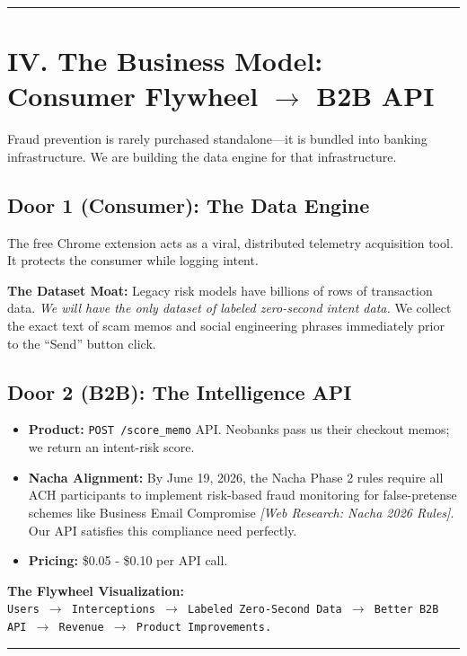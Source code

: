 \documentclass[11pt, letterpaper]{article}
\begin{document}
\vspace{12pt}
\hrule
\vspace{12pt}

\section*{IV. The Business Model: Consumer Flywheel $\rightarrow$ B2B API}

Fraud prevention is rarely purchased standalone—it is bundled into banking infrastructure. We are building the data engine for that infrastructure.

\subsection*{Door 1 (Consumer): The Data Engine}
The free Chrome extension acts as a viral, distributed telemetry acquisition tool. It protects the consumer while logging intent.

\textbf{The Dataset Moat:} Legacy risk models have billions of rows of transaction data. \textit{We will have the only dataset of labeled zero-second intent data.} We collect the exact text of scam memos and social engineering phrases immediately prior to the ``Send'' button click. 

\subsection*{Door 2 (B2B): The Intelligence API}
\begin{itemize}
    \item \textbf{Product:} \texttt{POST /score\_memo} API. Neobanks pass us their checkout memos; we return an intent-risk score.
    \item \textbf{Nacha Alignment:} By June 19, 2026, the Nacha Phase 2 rules require all ACH participants to implement risk-based fraud monitoring for false-pretense schemes like Business Email Compromise \textit{[Web Research: Nacha 2026 Rules]}. Our API satisfies this compliance need perfectly.
    \item \textbf{Pricing:} \$0.05 - \$0.10 per API call.
\end{itemize}

\textbf{The Flywheel Visualization:}\\
\texttt{Users $\rightarrow$ Interceptions $\rightarrow$ Labeled Zero-Second Data $\rightarrow$ Better B2B API $\rightarrow$ Revenue $\rightarrow$ Product Improvements.}

\vspace{12pt}
\hrule
\vspace{12pt}
\end{document}
